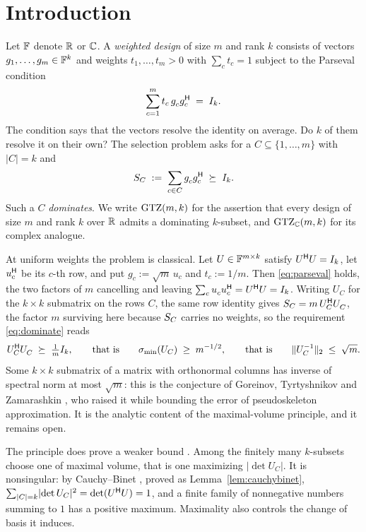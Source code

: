 \section{Introduction}\label{sec:intro}

Let $\mathbb{F}$ denote $\mathbb{R}$ or $\mathbb{C}$.  A \emph{weighted design} of size $m$ and
rank $k$ consists of vectors $g_1,\dots,g_m\in\mathbb{F}^k$ and weights
$t_1,\dots,t_m>0$ with $\sum_c t_c=1$ subject to the Parseval condition
\begin{equation}\label{eq:parseval}
  \sum_{c=1}^{m} t_c\, g_c^{\vphantom{\mathsf{H}}} g_c\adj \;=\; I_k .
\end{equation}
The condition says that the vectors resolve the identity on average.  Do
$k$ of them resolve it on their own?  The selection problem asks for a
$C\subseteq\{1,\dots,m\}$ with $\lvert C\rvert=k$ and
\begin{equation}\label{eq:dominate}
  \SC \;:=\; \sum_{c\in C} g_c^{\vphantom{\mathsf{H}}} g_c\adj \;\psd\; I_k .
\end{equation}
Such a $C$ \emph{dominates}.  We write $\mathrm{GTZ}(m,k)$ for the
assertion that every design of size $m$ and rank $k$ over $\mathbb{R}$ admits a
dominating $k$-subset, and $\mathrm{GTZ}_{\mathbb{C}}(m,k)$ for its complex analogue.

At uniform weights the problem is classical.  Let $U\in\mathbb{F}^{m\times k}$
satisfy $U^{\mathsf{H}} U=I_k$, let $u_c^{\mathsf{H}}$ be its $c$-th row, and put
$g_c:=\sqrt m\,u_c$ and $t_c:=1/m$.  Then \eqref{eq:parseval} holds,
the two factors of $m$ cancelling and leaving
$\sum_cu_c^{\vphantom{\mathsf{H}}}u_c\adj=U\adj U=I_k$.  Writing $U_C$ for the
$k\times k$ submatrix on the rows $C$, the same row identity gives
$\SC=m\,U_C\adj U_C^{\vphantom{\mathsf{H}}}$, the factor $m$ surviving here
because $S_{C}$ carries no weights, so the requirement
\eqref{eq:dominate} reads
\[
  U_C\adj U_C^{\vphantom{\mathsf{H}}}\;\psd\;\tfrac1m I_k,
  \qquad\text{that is}\qquad
  \sigma_{\min}(U_C)\;\ge\;m^{-1/2},
  \qquad\text{that is}\qquad
  \lVert U_C^{-1}\rVert_2\;\le\;\sqrt m .
\]
Some $k\times k$ submatrix of a matrix with orthonormal columns has
inverse of spectral norm at most $\sqrt m$: this is the conjecture of
Goreinov, Tyrtyshnikov and Zamarashkin \cite{GTZ1997}, who raised it while
bounding the error of pseudoskeleton approximation.  It is the analytic
content of the maximal-volume principle, and it remains open.

The principle does prove a weaker bound \cite{GZT1997,GT2001}.
Among the finitely many $k$-subsets choose one of maximal volume, that is
one maximizing $\lvert\det U_C\rvert$.  It is nonsingular: by
Cauchy--Binet \cite[\S0.8.7]{HornJohnson2013}, proved as
Lemma~\ref{lem:cauchybinet},
$\sum_{\lvert C\rvert=k}\lvert\det U_C\rvert^2=\det(U^{\mathsf{H}} U)=1$, and a
finite family of nonnegative numbers summing to $1$ has a positive
maximum.  Maximality also controls the change of basis it induces.

